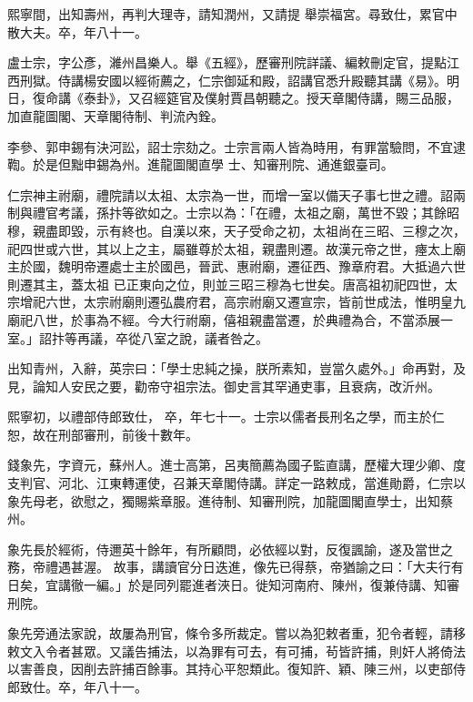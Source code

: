 \begin{pinyinscope}
 熙寧間，出知壽州，再判大理寺，請知潤州，又請提
 舉崇福宮。尋致仕，累官中散大夫。卒，年八十一。



 盧士宗，字公彥，濰州昌樂人。舉《五經》，歷審刑院詳議、編敕刪定官，提點江西刑獄。侍講楊安國以經術薦之，仁宗御延和殿，詔講官悉升殿聽其講《易》。明日，復命講《泰卦》，又召經筵官及僕射賈昌朝聽之。授天章閣侍講，賜三品服，加直龍圖閣、天章閣待制、判流內銓。



 李參、郭申錫有決河訟，詔士宗劾之。士宗言兩人皆為時用，有罪當驗問，不宜逮鞫。於是但黜申錫為州。進龍圖閣直學
 士、知審刑院、通進銀臺司。



 仁宗神主祔廟，禮院請以太祖、太宗為一世，而增一室以備天子事七世之禮。詔兩制與禮官考議，孫抃等欲如之。士宗以為：「在禮，太祖之廟，萬世不毀；其餘昭穆，親盡即毀，示有終也。自漢以來，天子受命之初，太祖尚在三昭、三穆之次，祀四世或六世，其以上之主，屬雖尊於太祖，親盡則遷。故漢元帝之世，瘞太上廟主於國，魏明帝遷處士主於國邑，晉武、惠祔廟，遷征西、豫章府君。大抵過六世則遷其主，蓋太祖
 已正東向之位，則並三昭三穆為七世矣。唐高祖初祀四世，太宗增祀六世，太宗祔廟則遷弘農府君，高宗祔廟又遷宣宗，皆前世成法，惟明皇九廟祀八世，於事為不經。今大行祔廟，僖祖親盡當遷，於典禮為合，不當添展一室。」詔抃等再議，卒從八室之說，議者咎之。



 出知青州，入辭，英宗曰：「學士忠純之操，朕所素知，豈當久處外。」命再對，及見，論知人安民之要，勸帝守祖宗法。御史言其罕通吏事，且衰病，改沂州。



 熙寧初，以禮部侍郎致仕，
 卒，年七十一。士宗以儒者長刑名之學，而主於仁恕，故在刑部審刑，前後十數年。



 錢象先，字資元，蘇州人。進士高第，呂夷簡薦為國子監直講，歷權大理少卿、度支判官、河北、江東轉運使，召兼天章閣侍講。詳定一路敕成，當進勛爵，仁宗以象先母老，欲慰之，獨賜紫章服。進待制、知審刑院，加龍圖閣直學士，出知蔡州。



 象先長於經術，侍邇英十餘年，有所顧問，必依經以對，反復諷諭，遂及當世之務，帝禮遇甚渥。
 故事，講讀官分日迭進，像先已得蔡，帝猶諭之曰：「大夫行有日矣，宜講徹一編。」於是同列罷進者浹日。徙知河南府、陳州，復兼侍講、知審刑院。



 象先旁通法家說，故屢為刑官，條令多所裁定。嘗以為犯敕者重，犯令者輕，請移敕文入令者甚眾。又議告捕法，以為罪有可去，有可捕，茍皆許捕，則奸人將倚法以害善良，因削去許捕百餘事。其持心平恕類此。復知許、穎、陳三州，以吏部侍郎致仕。卒，年八十一。




\end{pinyinscope}
